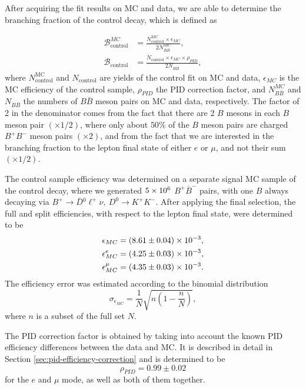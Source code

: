 After acquiring the fit results on MC and data, we are able to determine the branching fraction of the control decay, which is defined as

\begin{align}
\mathcal{B}^{MC}_{\mathrm{control}} &= \frac{N^{\mathrm{MC}}_\mathrm{control} \times \epsilon_{MC}}{2N_{B\bar B}^{MC}},\\
\mathcal{B}_{\mathrm{control}} &= \frac{N_\mathrm{control} \times \epsilon_{MC} \times \rho_{PID}}{2N_{B\bar B}},
\label{eq:br_data}
\end{align}
where $N^{\mathrm{MC}}_\mathrm{control}$ and $N_\mathrm{control}$ are yields of the control fit on MC and data, $\epsilon_{MC}$ is the MC efficiency of the control sample, $\rho_{PID}$ the PID correction factor, and $N_{B\bar B}^{MC}$ and $N_{B\bar B}$ the numbers of $B \bar B$ meson pairs on MC and data, respectively. The factor of 2 in the denominator comes from the fact that there are 2 $B$ mesons in each $B$ meson pair $(\times 1/2)$, where only about $50\%$ of the $B$ meson pairs are charged $B^+B^-$ meson pairs $(\times 2)$, and from the fact that we are interested in the branching fraction to the lepton final state of either $e$ or $\mu$, and not their sum $(\times 1/2)$.

The control sample efficiency was determined on a separate signal MC sample of the control decay, where we generated $5\times 10^{6}$ $B^+ \bar B^-$ pairs, with one $B$ always decaying via $B^+ \to \bar D {}^0 \ell^+ \nu,~D^0 \to K^+K^-$. After applying the final selection, the full and split efficiencies, with respect to the lepton final state, were determined to be 
\begin{align*}
\epsilon_{MC} &= (8.61\pm 0.04)\times 10^{-3},\\
\epsilon_{MC}^e &= (4.25\pm 0.03)\times 10^{-3},\\
\epsilon_{MC}^\mu &= (4.35\pm 0.03)\times 10^{-3}.
\end{align*}
The efficiency error was estimated according to the binomial distribution
\begin{equation*}
\sigma_{\epsilon_{MC}} = \frac{1}{N}\sqrt{n(1-\frac{n}{N})},
\end{equation*}
where $n$ is a subset of the full set $N$.

The PID correction factor is obtained by taking into account the known PID efficiency differences between the data and MC. It is described in detail in Section \ref{sec:pid-efficiency-correction} and is determined to be
\begin{equation*}
\rho_{PID} = 0.99\pm 0.02
\end{equation*}
for the $e$ and $\mu$ mode, as well as both of them together.

